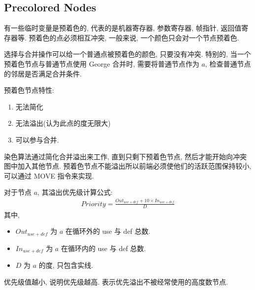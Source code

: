 \subsection{Precolored Nodes}
有一些临时变量是预着色的, 代表的是机器寄存器, 参数寄存器, 帧指针, 返回值寄存器等. 预着色的点必须相互冲突, 一般来说, 一个颜色只会对一个节点预着色. 

选择与合并操作可以给一个普通点被预着色的颜色, 只要没有冲突. 特别的, 当一个预着色节点与普通节点使用 George 合并时, 需要将普通节点作为 $a$, 检查普通节点的邻居是否满足合并条件. 

预着色节点特性:
\begin{enumerate}
    \item 无法简化
    \item 无法溢出(认为此点的度无限大)
    \item 可以参与合并.
\end{enumerate}

染色算法通过简化合并溢出来工作, 直到只剩下预着色节点, 然后才能开始向冲突图中加入其他节点. 预着色节点不能溢出所以前端必须使他们的活跃范围保持较小, 可以通过 MOVE 指令来实现. 

对于节点 $a$, 其溢出优先级计算公式: 
\begin{align*}
    Priority = \frac{Out_{use+def}+10\times In_{use+def}}{D}
\end{align*}
其中,
\begin{itemize}
    \item $Out_{use+def}$ 为 $a$ 在循环外的 use 与 def 总数.
    \item $In_{use+def}$ 为 $a$ 在循环内的 use 与 def 总数.
    \item $D$ 为 $a$ 的度, 只包含实线. 
\end{itemize}

优先级值越小, 说明优先级越高. 表示优先溢出不被经常使用的高度数节点. 


